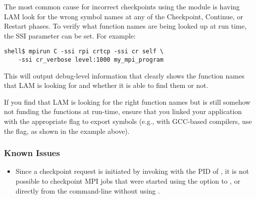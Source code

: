 The most common cause for incorrect checkpoints using the 
module is having LAM look for the wrong symbol names at any of the
Checkpoint, Continue, or Restart phases.  To verify what function
names are being looked up at run time, the 
SSI parameter can be set.  For example:

\lstset{style=lam-cmdline}
\begin{lstlisting}
shell$ mpirun C -ssi rpi crtcp -ssi cr self \
    -ssi cr_verbose level:1000 my_mpi_program
\end{lstlisting}

This will output debug-level information that clearly shows the
function names that LAM is looking for and whether it is able to find
them or not.

If you find that LAM is looking for the right function names but is
still somehow not funding the functions at run-time, ensure that you
linked your application with the appropriate flag to export symbols
(e.g., with GCC-based compilers, use the \cmd{-export} flag, as shown
in the example above).

 
\subsubsection{Known Issues}

\begin{itemize}

\item Since a checkpoint request is initiated by invoking
   with the PID of , it is not possible
  to checkpoint MPI jobs that were started using the \cmdarg{-nw}
  option to , or directly from the command-line without
  using \cmd{mpirun}.

\end{itemize}

